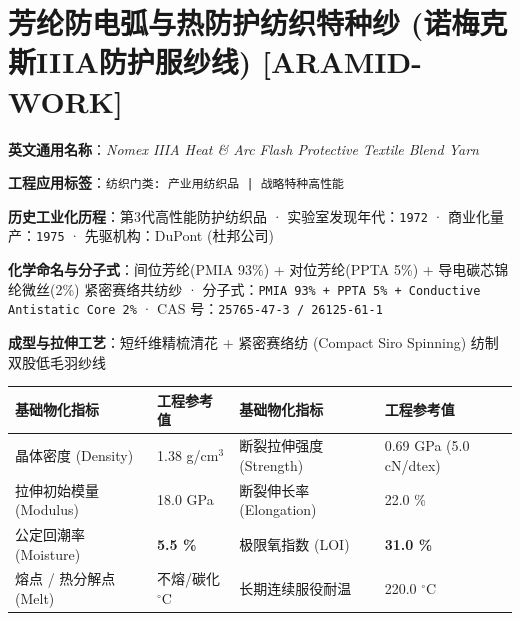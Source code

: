 \documentclass[11pt,openright,twoside,UTF8]{ctexbook}
\begin{document}
\section{芳纶防电弧与热防护纺织特种纱 (诺梅克斯IIIA防护服纱线) [ARAMID-WORK]}
\label{sec:aramid-work}

\noindent\textbf{英文通用名称}：\textit{Nomex IIIA Heat \& Arc Flash Protective Textile Blend Yarn}\par
\noindent\textbf{工程应用标签}：\texttt{纺织门类: 产业用纺织品 | 战略特种高性能}\par
\noindent\textbf{历史工业化历程}：第3代高性能防护纺织品 · 实验室发现年代：\texttt{1972} · 商业化量产：\texttt{1975} · 先驱机构：DuPont (杜邦公司)\par
\noindent\textbf{化学命名与分子式}：间位芳纶(PMIA 93\%) + 对位芳纶(PPTA 5\%) + 导电碳芯锦纶微丝(2\%) 紧密赛络共纺纱 · 分子式：\texttt{PMIA 93\% + PPTA 5\% + Conductive Antistatic Core 2\%} · CAS 号：\texttt{25765-47-3 / 26125-61-1}\par
\noindent\textbf{成型与拉伸工艺}：短纤维精梳清花 + 紧密赛络纺 (Compact Siro Spinning) 纺制双股低毛羽纱线\par

\vspace{0.15cm}
\begin{center}
\small
\begin{tabularx}{\textwidth}{p{3.8cm}Xp{3.8cm}X}
\toprule
\textbf{基础物化指标} & \textbf{工程参考值} & \textbf{基础物化指标} & \textbf{工程参考值} \\
\midrule
晶体密度 (Density) & 1.38 g/cm$^3$ & 断裂拉伸强度 (Strength) & 0.69 GPa (5.0 cN/dtex) \\
拉伸初始模量 (Modulus) & 18.0 GPa & 断裂伸长率 (Elongation) & 22.0 \% \\
公定回潮率 (Moisture) & \textbf{5.5 \%} & 极限氧指数 (LOI) & \textbf{31.0 \%} \\
熔点 / 热分解点 (Melt) & 不熔/碳化 $^\circ\mathrm{C}$ & 长期连续服役耐温 & 220.0 $^\circ\mathrm{C}$ \\
\bottomrule
\end{tabularx}
\end{center}
\vspace{0.15cm}
\end{document}
